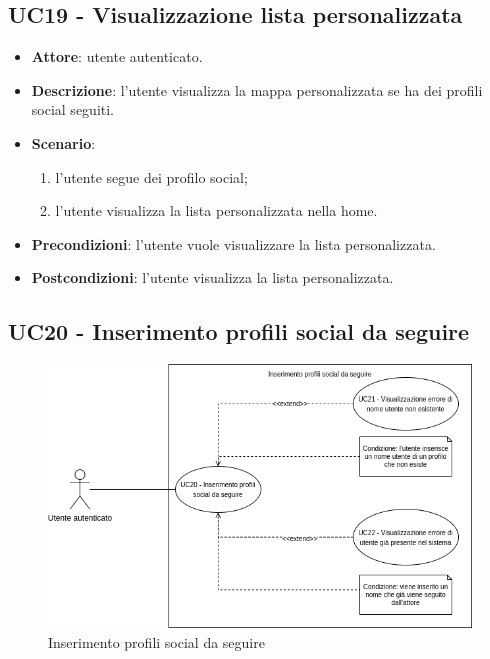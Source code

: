 \subsection{UC19 - Visualizzazione lista personalizzata}
\begin{itemize}
    \item \textbf{Attore}: utente autenticato.
    \item \textbf{Descrizione}: l'utente visualizza la mappa personalizzata se ha dei profili social seguiti.
    \item \textbf{Scenario}:
    \begin{enumerate}
        \item l'utente segue dei profilo social;
        \item l'utente visualizza la lista personalizzata nella home.
    \end{enumerate}

    \item \textbf{Precondizioni}: l'utente vuole visualizzare la lista personalizzata.
    \item \textbf{Postcondizioni}: l'utente visualizza la lista personalizzata.
\end{itemize}

\subsection{UC20 - Inserimento profili social da seguire}
\begin{figure}[H]
    \includegraphics[width=15cm]{sezioni/Images/UC20.png}
    \centering
    \caption{Inserimento profili social da seguire}
\end{figure}

